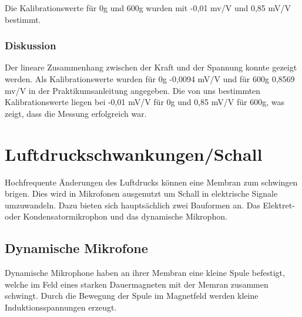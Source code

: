 \documentclass[12pt,a4paper]{article}
\begin{document}
Die Kalibrationswerte für 0g und 600g wurden mit -0,01 mv/V und 0,85 mV/V bestimmt.

\subsubsection*{Diskussion}

Der lineare Zusammenhang zwischen der Kraft und der Spannung konnte gezeigt werden. Als Kalibrationswerte wurden für 0g -0,0094 mV/V und für 600g 0,8569 mv/V in der Praktikumsanleitung angegeben. Die von uns bestimmten Kalibrationswerte liegen bei -0,01 mV/V für 0g und 0,85 mV/V für 600g, was zeigt, dass die Messung erfolgreich war.

\section{Luftdruckschwankungen/Schall}
Hochfrequente Änderungen des Luftdrucks können eine Membran zum schwingen brigen. Dies wird in Mikrofonen ausgenutzt um Schall in elektrische Signale umzuwandeln. Dazu bieten sich hauptsächlich zwei Bauformen an. Das Elektret- oder Kondensatormikrophon und das dynamische Mikrophon.
\subsection{Dynamische Mikrofone}
Dynamische Mikrophone haben an ihrer Membran eine kleine Spule befestigt, welche im Feld eines starken Dauermagneten mit der Memran zusammen schwingt. Durch die Bewegung der Spule im Magnetfeld werden kleine Induktionsspannungen erzeugt.
\end{document}
